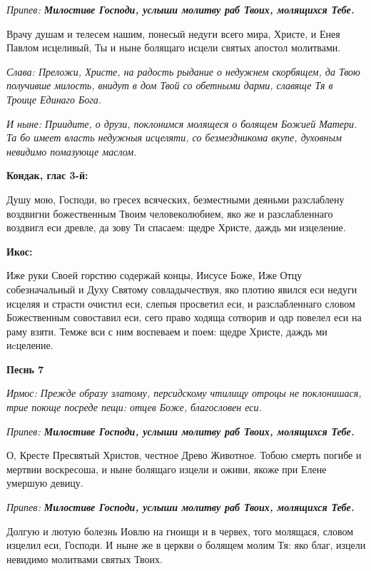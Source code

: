 \itshape Припев: \normalfont{}\bfseries Милостиве Господи, услыши молитву раб Твоих, молящихся Тебе.

\normalfont{}Врачу душам и телесем нашим, понесый недуги всего мира, Христе, и Енея Павлом исцеливый, Ты и ныне болящаго исцели святых апостол молитвами.

\itshape Слава: \normalfont{}Преложи, Христе, на радость рыдание о недужнем скорбящем, да Твою получивше милость, внидут в дом Твой со обетными дарми, славяще Тя в Троице Единаго Бога.

\itshape И ныне: \normalfont{}Приидите, о друзи, поклонимся молящеся о болящем Божией Матери. Та бо имеет власть недужныя исцеляти, со безмездникома вкупе, духовным невидимо помазующе маслом.


\medskip


\bfseries Кондак, глас 3-й:\normalfont{}


Душу мою, Господи, во гресех всяческих, безместными деяньми разслаблену воздвигни божественным Твоим человеколюбием, яко же и разслабленнаго воздвигл еси древле, да зову Ти спасаем: щедре Христе, даждь ми изцеление.


\medskip


\bfseries Икос:\normalfont{}


Иже руки Своей горстию содержай концы, Иисусе Боже, Иже Отцу собезначальный и Духу Святому совладычествуя, яко плотию явился еси недуги исцеляя и страсти очистил еси, слепыя просветил еси, и разслабленнаго словом Божественным совоставил еси, сего право ходяща сотворив и одр повелел еси на раму взяти. Темже вси с ним воспеваем и поем: щедре Христе, даждь ми иcцеление.


\medskip


\bfseries Песнь 7\normalfont{}


\itshape Ирмос: \normalfont{}Прежде образу златому, персидскому чтилищу отроцы не поклонишася, трие поюще посреде пещи: отцев Боже, благословен еси.

\itshape Припев: \normalfont{}\bfseries Милостиве Господи, услыши молитву раб Твоих, молящихся Тебе.

\normalfont{}О, Кресте Пресвятый Христов, честное Древо Животное. Тобою смерть погибе и мертвии воскресоша, и ныне болящаго изцели и оживи, якоже при Елене умершую девицу.

\itshape Припев: \normalfont{}\bfseries Милостиве Господи, услыши молитву раб Твоих, молящихся Тебе.

\normalfont{}Долгую и лютую болезнь Иовлю на гноищи и в червех, того молящася, словом изцелил еси, Господи. И ныне же в церкви о болящем молим Тя: яко благ, изцели невидимо молитвами святых Твоих.

